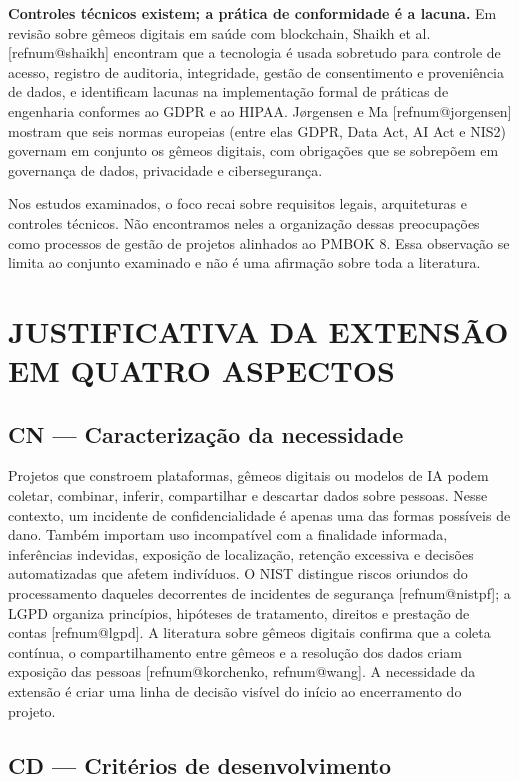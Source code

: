 \documentclass[12pt,a4paper,article,oneside,english,brazil]{abntex2}
\makeatletter
\newcommand{\refnum}[1]{\csname refnum@#1\endcsname}
\makeatother
\begin{document}
\textbf{Controles técnicos existem; a prática de conformidade é a lacuna.} Em revisão sobre gêmeos digitais em saúde com blockchain, Shaikh et al. [\refnum{shaikh}] encontram que a tecnologia é usada sobretudo para controle de acesso, registro de auditoria, integridade, gestão de consentimento e proveniência de dados, e identificam lacunas na implementação formal de práticas de engenharia conformes ao GDPR e ao HIPAA. Jørgensen e Ma [\refnum{jorgensen}] mostram que seis normas europeias (entre elas GDPR, Data Act, AI Act e NIS2) governam em conjunto os gêmeos digitais, com obrigações que se sobrepõem em governança de dados, privacidade e cibersegurança.

Nos estudos examinados, o foco recai sobre requisitos legais, arquiteturas e controles técnicos. Não encontramos neles a organização dessas preocupações como processos de gestão de projetos alinhados ao PMBOK 8. Essa observação se limita ao conjunto examinado e não é uma afirmação sobre toda a literatura.

\section{JUSTIFICATIVA DA EXTENSÃO EM QUATRO ASPECTOS}
\subsection{CN — Caracterização da necessidade}

Projetos que constroem plataformas, gêmeos digitais ou modelos de IA podem coletar, combinar, inferir, compartilhar e descartar dados sobre pessoas. Nesse contexto, um incidente de confidencialidade é apenas uma das formas possíveis de dano. Também importam uso incompatível com a finalidade informada, inferências indevidas, exposição de localização, retenção excessiva e decisões automatizadas que afetem indivíduos. O NIST distingue riscos oriundos do processamento daqueles decorrentes de incidentes de segurança [\refnum{nistpf}]; a LGPD organiza princípios, hipóteses de tratamento, direitos e prestação de contas [\refnum{lgpd}]. A literatura sobre gêmeos digitais confirma que a coleta contínua, o compartilhamento entre gêmeos e a resolução dos dados criam exposição das pessoas [\refnum{korchenko}, \refnum{wang}]. A necessidade da extensão é criar uma linha de decisão visível do início ao encerramento do projeto.
\subsection{CD — Critérios de desenvolvimento}
\end{document}
